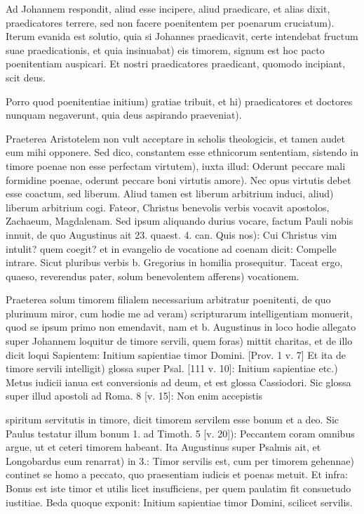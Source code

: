 Ad Johannem respondit, aliud esse incipere, aliud praedicare, et alias dixit, praedicatores terrere, sed non facere poenitentem per poenarum cruciatum). Iterum evanida est solutio, quia si Johannes praedicavit, certe intendebat fructum suae praedicationis, et quia insinuabat) eis timorem, signum est hoc pacto poenitentiam auspicari. Et nostri praedicatores praedicant, quomodo incipiant, scit deus.

Porro quod poenitentiae initium) gratiae tribuit, et hi) praedicatores et doctores nunquam negaverunt, quia deus aspirando praeveniat).

Praeterea Aristotelem non vult acceptare in scholis theologicis, et tamen audet eum mihi opponere. Sed dico, constantem esse ethnicorum sententiam, \marginpar{\small[366]} sistendo in timore poenae non esse perfectam virtutem), iuxta illud: Oderunt peccare mali formidine poenae, oderunt peccare boni virtutis amore). Nec opus virtutis debet esse coactum, sed liberum. Aliud tamen est liberum arbitrium induci, aliud) liberum arbitrium cogi. Fateor, Christus benevolis verbis vocavit apostolos, Zachaeum, Magdalenam. Sed ipsum aliquando durius vocare, factum Pauli nobis innuit, de quo Augustinus ait 23. quaest. 4. can. Quis nos): Cui Christus vim intulit? quem coegit? et in evangelio de vocatione ad coenam dicit: Compelle intrare. Sicut pluribus verbis b. Gregorius in homilia prosequitur. Taceat ergo, quaeso, reverendus pater, solum benevolentem afferens) vocationem.

Praeterea solum timorem filialem necessarium arbitratur poenitenti, de quo plurimum miror, cum hodie me ad veram) scripturarum intelligentiam monuerit, quod se ipsum primo non emendavit, nam et b. Augustinus in loco hodie allegato super Johannem loquitur de timore servili, quem foras) mittit charitas, et de illo dicit loqui Sapientem: Initium sapientiae timor Domini. [Prov. 1 v. 7] Et ita de timore servili intelligit) glossa super Psal. [111 v. 10]: Initium sapientiae etc.) Metus iudicii ianua est conversionis ad deum, et est glossa Cassiodori. Sic glossa super illud apostoli ad Roma. 8 [v. 15]: Non enim accepistis

spiritum servitutis in timore, dicit timorem servilem esse bonum et a deo. Sic Paulus testatur illum bonum 1. ad Timoth. 5 [v. 20]): Peccantem coram omnibus argue, ut et ceteri timorem habeant. Ita Augustinus super Psalmis ait, et Longobardus eum renarrat) in 3.: Timor servilis est, cum per timorem gehennae) continet se homo a peccato, quo praesentiam iudicis et poenas metuit. Et infra: Bonus est iste timor et utilis licet insufficiens, per quem paulatim fit consuetudo iustitiae. Beda quoque exponit: Initium sapientiae timor Domini, scilicet servilis.

